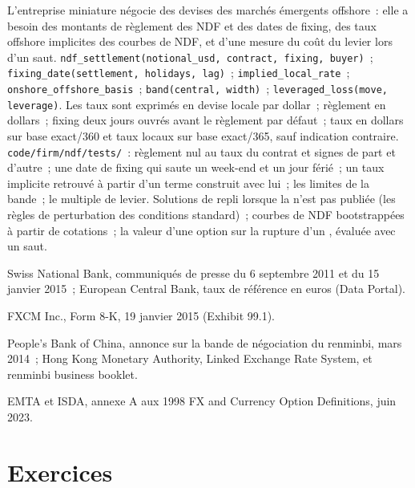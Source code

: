 \begin{build}
 L'entreprise miniature négocie des devises des marchés émergents offshore~:
elle a besoin des montants de règlement des NDF et des dates de fixing, des taux offshore implicites
des courbes de NDF, et d'une mesure du coût du levier lors d'un saut.  \texttt{ndf\_settlement(notional\_usd, contract, fixing,
buyer)}~; \texttt{fixing\_date(settlement, holidays, lag)}~;
\texttt{implied\_local\_rate}~; \texttt{onshore\_offshore\_basis}~;
\texttt{band(central, width)}~; \texttt{leveraged\_loss(move, leverage)}.
 Les taux sont exprimés en devise locale par dollar~; règlement en dollars~;
fixing deux jours ouvrés avant le règlement par défaut~; taux en dollars sur base
exact/360 et taux locaux sur base exact/365, sauf indication contraire.
 \texttt{code/firm/ndf/tests/}~: règlement nul au
taux du contrat et signes de part et d'autre~; une date de fixing qui saute un week-end et un
jour férié~; un taux implicite retrouvé à partir d'un terme construit avec lui~; les limites de la
bande~; le multiple de levier.
 Solutions de repli lorsque la  n'est pas publiée (les
règles de perturbation des conditions standard)~; courbes de NDF bootstrappées à partir de cotations~;
la valeur d'une option sur la rupture d'un , évaluée avec un saut.
\end{build}

\begin{omsources}
\item Swiss National Bank, communiqués de presse du 6 septembre 2011 et du 15 janvier 2015~;
European Central Bank, taux de référence en euros (Data Portal).
\item FXCM Inc., Form 8-K, 19 janvier 2015 (Exhibit 99.1).
\item People's Bank of China, annonce sur la bande de négociation du renminbi, mars
2014~; Hong Kong Monetary Authority, Linked Exchange Rate System, et renminbi
business booklet.
\item EMTA et ISDA, annexe A aux 1998 FX and Currency Option Definitions, juin
2023.
\end{omsources}

\section{Exercices}


